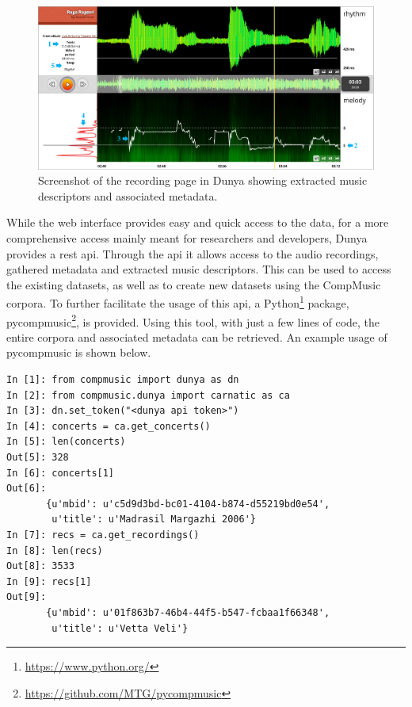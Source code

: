 \begin{figure}
	\begin{center}
		\includegraphics[width=\figSizeHundred]{ch08_applications/figures/dunyaScreenshot.pdf}
		\end{center}
		\caption[Screenshot of the recording page in Dunya]{Screenshot of the recording page in Dunya showing extracted music descriptors and associated metadata.}
		\label{fig:dunya_recording}
\end{figure}

While the web interface provides easy and quick access to the data, for a more comprehensive access mainly meant for researchers and developers, Dunya provides a \acrshort{rest} \acrshort{api}. Through the \acrshort{api} it allows access to the audio recordings, gathered metadata and extracted music descriptors. This can be used to access the existing datasets, as well as to create new datasets using the CompMusic corpora. To further facilitate the usage of this \acrshort{api}, a Python\footnote{\url{https://www.python.org/}} package, \gls{pycompmusic}\footnote{\url{https://github.com/MTG/pycompmusic}}, is provided. Using this tool, with just a few lines of code, the entire corpora and associated metadata can be retrieved. An example usage of \gls{pycompmusic} is shown below.

%
%
%
%
%
{
	\small
\begin{verbatim}
In [1]: from compmusic import dunya as dn
In [2]: from compmusic.dunya import carnatic as ca
In [3]: dn.set_token("<dunya api token>")
In [4]: concerts = ca.get_concerts()
In [5]: len(concerts)
Out[5]: 328
In [6]: concerts[1]
Out[6]: 
       {u'mbid': u'c5d9d3bd-bc01-4104-b874-d55219bd0e54',
        u'title': u'Madrasil Margazhi 2006'}
In [7]: recs = ca.get_recordings()
In [8]: len(recs)
Out[8]: 3533
In [9]: recs[1]
Out[9]: 
       {u'mbid': u'01f863b7-46b4-44f5-b547-fcbaa1f66348',
        u'title': u'Vetta Veli'}        
\end{verbatim}
}


